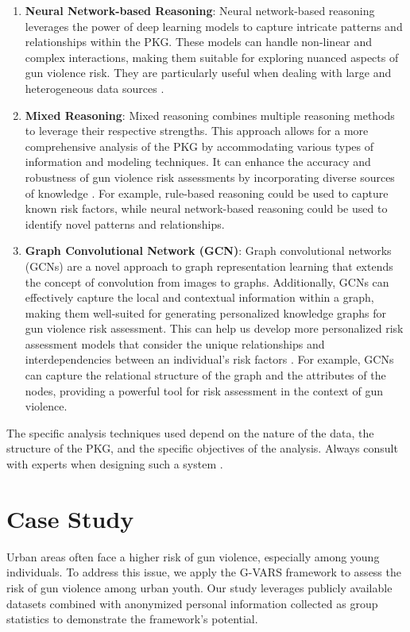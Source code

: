 \documentclass[11pt]{article}
\begin{document}
\begin{enumerate} [label=(\roman*)]
\item \textbf{Neural Network-based Reasoning}: Neural network-based reasoning leverages the power of deep learning models to capture intricate patterns and relationships within the PKG. These models can handle non-linear and complex interactions, making them suitable for exploring nuanced aspects of gun violence risk. They are particularly useful when dealing with large and heterogeneous data sources \cite{sun2021generation}.
\item \textbf{Mixed Reasoning}: Mixed reasoning combines multiple reasoning methods to leverage their respective strengths. This approach allows for a more comprehensive analysis of the PKG by accommodating various types of information and modeling techniques. It can enhance the accuracy and robustness of gun violence risk assessments by incorporating diverse sources of knowledge \cite{sun2021generation}. For example, rule-based reasoning could be used to capture known risk factors, while neural network-based reasoning could be used to identify novel patterns and relationships.
\item \textbf{Graph Convolutional Network (GCN)}: Graph convolutional networks (GCNs) are a novel approach to graph representation learning that extends the concept of convolution from images to graphs. Additionally, GCNs can effectively capture the local and contextual information within a graph, making them well-suited for generating personalized knowledge graphs for gun violence risk assessment. This can help us develop more personalized risk assessment models that consider the unique relationships and interdependencies between an individual's risk factors \cite{gentile2019personalized}. For example, GCNs can capture the relational structure of the graph and the attributes of the nodes, providing a powerful tool for risk assessment in the context of gun violence.
\end{enumerate}

The specific analysis techniques used depend on the nature of the data, the structure of the PKG, and the specific objectives of the analysis. Always consult with experts when designing such a system \cite{kejriwal2022knowledge,Slawski_2022,yang2021research,sun2021generation,safavi2019personalized,gong2021construction,munir2023integrated,chen2022overview,gentile2019personalized}.


\section{Case Study}\label{sec:experiment}
Urban areas often face a higher risk of gun violence, especially among young individuals. To address this issue, we apply the \textsf{G-VARS} framework to assess the risk of gun violence among urban youth. Our study leverages publicly available datasets combined with anonymized personal information collected as group statistics to demonstrate the framework's potential.
\end{document}

